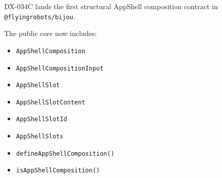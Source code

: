 DX-034C lands the first structural AppShell composition contract in \texttt{@\allowbreak{}f\allowbreak{}l\allowbreak{}y\allowbreak{}i\allowbreak{}n\allowbreak{}g\allowbreak{}r\allowbreak{}o\allowbreak{}b\allowbreak{}o\allowbreak{}t\allowbreak{}s\allowbreak{}/\allowbreak{}b\allowbreak{}i\allowbreak{}j\allowbreak{}o\allowbreak{}u}.

The public core now includes:

\begin{itemize}
\tightlist
\item
  \texttt{A\allowbreak{}p\allowbreak{}p\allowbreak{}S\allowbreak{}h\allowbreak{}e\allowbreak{}l\allowbreak{}l\allowbreak{}C\allowbreak{}o\allowbreak{}m\allowbreak{}p\allowbreak{}o\allowbreak{}s\allowbreak{}i\allowbreak{}t\allowbreak{}i\allowbreak{}o\allowbreak{}n}
\item
  \texttt{A\allowbreak{}p\allowbreak{}p\allowbreak{}S\allowbreak{}h\allowbreak{}e\allowbreak{}l\allowbreak{}l\allowbreak{}C\allowbreak{}o\allowbreak{}m\allowbreak{}p\allowbreak{}o\allowbreak{}s\allowbreak{}i\allowbreak{}t\allowbreak{}i\allowbreak{}o\allowbreak{}n\allowbreak{}I\allowbreak{}n\allowbreak{}p\allowbreak{}u\allowbreak{}t}
\item
  \texttt{A\allowbreak{}p\allowbreak{}p\allowbreak{}S\allowbreak{}h\allowbreak{}e\allowbreak{}l\allowbreak{}l\allowbreak{}S\allowbreak{}l\allowbreak{}o\allowbreak{}t}
\item
  \texttt{A\allowbreak{}p\allowbreak{}p\allowbreak{}S\allowbreak{}h\allowbreak{}e\allowbreak{}l\allowbreak{}l\allowbreak{}S\allowbreak{}l\allowbreak{}o\allowbreak{}t\allowbreak{}C\allowbreak{}o\allowbreak{}n\allowbreak{}t\allowbreak{}e\allowbreak{}n\allowbreak{}t}
\item
  \texttt{A\allowbreak{}p\allowbreak{}p\allowbreak{}S\allowbreak{}h\allowbreak{}e\allowbreak{}l\allowbreak{}l\allowbreak{}S\allowbreak{}l\allowbreak{}o\allowbreak{}t\allowbreak{}I\allowbreak{}d}
\item
  \texttt{A\allowbreak{}p\allowbreak{}p\allowbreak{}S\allowbreak{}h\allowbreak{}e\allowbreak{}l\allowbreak{}l\allowbreak{}S\allowbreak{}l\allowbreak{}o\allowbreak{}t\allowbreak{}s}
\item
  \texttt{d\allowbreak{}e\allowbreak{}f\allowbreak{}i\allowbreak{}n\allowbreak{}e\allowbreak{}A\allowbreak{}p\allowbreak{}p\allowbreak{}S\allowbreak{}h\allowbreak{}e\allowbreak{}l\allowbreak{}l\allowbreak{}C\allowbreak{}o\allowbreak{}m\allowbreak{}p\allowbreak{}o\allowbreak{}s\allowbreak{}i\allowbreak{}t\allowbreak{}i\allowbreak{}o\allowbreak{}n\allowbreak{}(\allowbreak{})}
\item
  \texttt{i\allowbreak{}s\allowbreak{}A\allowbreak{}p\allowbreak{}p\allowbreak{}S\allowbreak{}h\allowbreak{}e\allowbreak{}l\allowbreak{}l\allowbreak{}C\allowbreak{}o\allowbreak{}m\allowbreak{}p\allowbreak{}o\allowbreak{}s\allowbreak{}i\allowbreak{}t\allowbreak{}i\allowbreak{}o\allowbreak{}n\allowbreak{}(\allowbreak{})}
\end{itemize}

